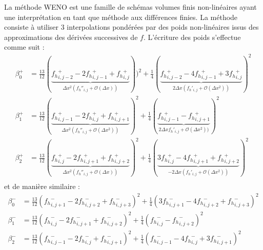 La méthode WENO est une famille de schémas volumes finis non-linéaires ayant une interprétation en tant que méthode aux différences finies. La méthode consiste à utiliser 3 interpolations pondérées par des poids non-linéaires issus des approximations des dérivées successives de $f$. L'écriture des poids s'effectue comme suit :
$$
  \begin{aligned}
    \beta_0^+ &= \frac{13}{12}( \underbrace{\left.f_h\right.^+_{i,j-2} - 2\left.f_h\right.^+_{i,j-1} + \left.f_h\right.^+_{i,j}  }_{\Delta x^2(\left.f_h\right.''_{i,j} + \mathcal{O}(\Delta x))}))^2   + \frac{1}{4}( \underbrace{  \left.f_h\right.^+_{i,j-2} - 4\left.f_h\right.^+_{i,j-1} + 3\left.f_h\right.^+_{i,j}  }_{ 2\Delta x ( \left.f_h\right.'_{i,j} + \mathcal{O}(\Delta x^2))})^2 \\
    \beta_1^+ &= \frac{13}{12}( \underbrace{\left.f_h\right.^+_{i,j-1} - 2\left.f_h\right.^+_{i,j}   + \left.f_h\right.^+_{i,j+1}}_{\Delta x^2(\left.f_h\right.''_{i,j} + \mathcal{O}(\Delta x^2))} )^2 + \frac{1}{4}( \underbrace{  \left.f_h\right.^+_{i,j-1} -                                \left.f_h\right.^+_{i,j+1}}_{ 2\Delta x   \left.f_h\right.'_{i,j} + \mathcal{O}(\Delta x^2))})^2 \\
    \beta_2^+ &= \frac{13}{12}( \underbrace{\left.f_h\right.^+_{i,j}   - 2\left.f_h\right.^+_{i,j+1} + \left.f_h\right.^+_{i,j+2}}_{\Delta x^2(\left.f_h\right.''_{i,j} + \mathcal{O}(\Delta x))} )^2   + \frac{1}{4}( \underbrace{ 3\left.f_h\right.^+_{i,j}   - 4\left.f_h\right.^+_{i,j+1} +  \left.f_h\right.^+_{i,j+2}}_{-2\Delta x ( \left.f_h\right.'_{i,j} + \mathcal{O}(\Delta x^2))})^2 \\
  \end{aligned}
$$
et de manière similaire :
$$
  \begin{aligned}
    \beta_0^- &= \frac{13}{12}(\left.f_h\right.^-_{i,j+1} - 2\left.f_h\right.^-_{i,j+2} + \left.f_h\right.^-_{i,j+3})^2 + \frac{1}{4}(3\left.f_h\right.^-_{i,j+1} - 4\left.f_h\right.^-_{i,j+2} +  \left.f_h\right.^-_{i,j+3})^2 \\
    \beta_1^- &= \frac{13}{12}(\left.f_h\right.^-_{i,j}   - 2\left.f_h\right.^-_{i,j+1} + \left.f_h\right.^-_{i,j+2})^2 + \frac{1}{4}( \left.f_h\right.^-_{i,j}   -  \left.f_h\right.^-_{i,j+2})^2 \\
    \beta_2^- &= \frac{13}{12}(\left.f_h\right.^-_{i,j-1} - 2\left.f_h\right.^-_{i,j}   + \left.f_h\right.^-_{i,j+1})^2 + \frac{1}{4}( \left.f_h\right.^-_{i,j-1} - 4\left.f_h\right.^-_{i,j}   + 3\left.f_h\right.^-_{i,j+1})^2 \\
  \end{aligned}
$$
